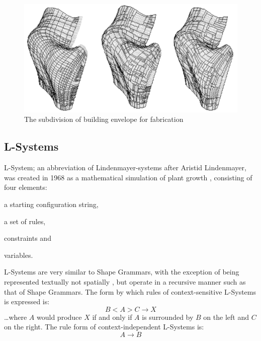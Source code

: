 \begin{figure}[htbp]
\centering
\includegraphics[width=\textwidth]{./Images/14-SurfaceFabrication}
\caption[Fabrication Surface Subdivision]{The subdivision of building envelope for fabrication \cite{shelden02}}
\label{SubdFab}
\end{figure}

\clearpage
\subsection{L-Systems}

L-System; an abbreviation of Lindenmayer-systems after Aristid Lindenmayer, was created in 1968 as a mathematical simulation of plant growth \cite{fasoulaki08}, consisting of four elements: \begin{inparaenum} \item a starting configuration string, \item a set of rules, \item constraints and \item variables.\end{inparaenum}

L-Systems are very similar to Shape Grammars, with the exception of being represented textually not spatially \cite{arida04}, but operate in a recursive manner such as that of Shape Grammars. The form by which rules of context-sensitive L-Systems is expressed is: \begin{equation} B<A>C\rightarrow X \end{equation}\ldots where $A$ would produce $X$ if and only if $A$ is surrounded by $B$ on the left and $C$ on the right. The rule form of context-independent L-Systems is: \begin{equation} A \rightarrow B \end{equation}

